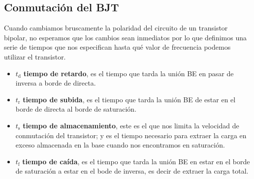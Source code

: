 \subsection{Conmutación del BJT}
Cuando cambiamos bruscamente la polaridad del circuito de un transistor bipolar, no esperamos que los cambios sean inmediatos por lo que definimos una serie de tiempos que nos especifican hasta qué valor de frecuencia podemos utilizar el transistor.
\begin{itemize}
    \item $t_\mathrm{d}$ \textbf{tiempo de retardo}, es el tiempo que tarda la unión BE en pasar de inversa a borde de directa.
    \item $t_\mathrm{r}$ \textbf{tiempo de subida}, es el tiempo que tarda la unión BE de estar en el borde de directa al borde de saturación.
    \item $t_\mathrm{s}$ \textbf{tiempo de almacenamiento}, este es el que nos limita la velocidad de conmutación del transistor; y es el tiempo necesario para extraer la carga en exceso almacenada en la base cuando nos encontramos en saturación.
    \item $t_\mathrm{f}$ \textbf{tiempo de caída}, es el tiempo que tarda la unión BE en estar en el borde de saturación a estar en el bode de inversa, es decir de extraer la carga total.
\end{itemize}
